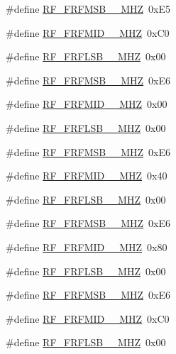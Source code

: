 \begin{DoxyCompactItemize}
\item 
\#define \hyperlink{sx1276Regs-Fsk_8h_aa5948b0994ec297dab348596c157f83e}{R\+F\+\_\+\+F\+R\+F\+M\+S\+B\+\_\+\_\+\+M\+HZ}~0x\+E5
\item 
\#define \hyperlink{sx1276Regs-Fsk_8h_aa290b930290cc4e553b4ab66ae76110d}{R\+F\+\_\+\+F\+R\+F\+M\+I\+D\+\_\+\_\+\+M\+HZ}~0x\+C0
\item 
\#define \hyperlink{sx1276Regs-Fsk_8h_a5015a2c3439f35865780ba16fefb1493}{R\+F\+\_\+\+F\+R\+F\+L\+S\+B\+\_\+\_\+\+M\+HZ}~0x00
\item 
\#define \hyperlink{sx1276Regs-Fsk_8h_ac8513596ed36e9470cbeb19a1e8e9951}{R\+F\+\_\+\+F\+R\+F\+M\+S\+B\+\_\+\_\+\+M\+HZ}~0x\+E6
\item 
\#define \hyperlink{sx1276Regs-Fsk_8h_ac4e4c5efd901db32fc8ba24c6875d05f}{R\+F\+\_\+\+F\+R\+F\+M\+I\+D\+\_\+\_\+\+M\+HZ}~0x00
\item 
\#define \hyperlink{sx1276Regs-Fsk_8h_a43714471acd2a688c20cdd6b5eedaa35}{R\+F\+\_\+\+F\+R\+F\+L\+S\+B\+\_\+\_\+\+M\+HZ}~0x00
\item 
\#define \hyperlink{sx1276Regs-Fsk_8h_a3b3f235e4db9c9622527591ca7916c87}{R\+F\+\_\+\+F\+R\+F\+M\+S\+B\+\_\+\_\+\+M\+HZ}~0x\+E6
\item 
\#define \hyperlink{sx1276Regs-Fsk_8h_a0ac29b7ceadd42ee420ff9edfe9e8e79}{R\+F\+\_\+\+F\+R\+F\+M\+I\+D\+\_\+\_\+\+M\+HZ}~0x40
\item 
\#define \hyperlink{sx1276Regs-Fsk_8h_a1f2bb1e7bc8fbd6e621de9eba5c86f91}{R\+F\+\_\+\+F\+R\+F\+L\+S\+B\+\_\+\_\+\+M\+HZ}~0x00
\item 
\#define \hyperlink{sx1276Regs-Fsk_8h_a963d533d9223136c79c216730aa5652a}{R\+F\+\_\+\+F\+R\+F\+M\+S\+B\+\_\+\_\+\+M\+HZ}~0x\+E6
\item 
\#define \hyperlink{sx1276Regs-Fsk_8h_a8a4cffed719d7412c18649f04f7b5c5e}{R\+F\+\_\+\+F\+R\+F\+M\+I\+D\+\_\+\_\+\+M\+HZ}~0x80
\item 
\#define \hyperlink{sx1276Regs-Fsk_8h_ad25234b1263e37abda8f6cc585c939ca}{R\+F\+\_\+\+F\+R\+F\+L\+S\+B\+\_\+\_\+\+M\+HZ}~0x00
\item 
\#define \hyperlink{sx1276Regs-Fsk_8h_aa6e42390611123d77589fc770058555c}{R\+F\+\_\+\+F\+R\+F\+M\+S\+B\+\_\+\_\+\+M\+HZ}~0x\+E6
\item 
\#define \hyperlink{sx1276Regs-Fsk_8h_a90947d1a0f48c89486946fffe628ff78}{R\+F\+\_\+\+F\+R\+F\+M\+I\+D\+\_\+\_\+\+M\+HZ}~0x\+C0
\item 
\#define \hyperlink{sx1276Regs-Fsk_8h_a347e6771a94a6176cc90415848828eb1}{R\+F\+\_\+\+F\+R\+F\+L\+S\+B\+\_\+\_\+\+M\+HZ}~0x00

\end{DoxyCompactItemize}
